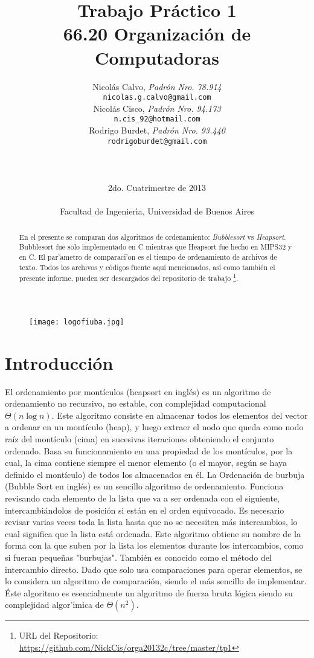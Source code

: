 \documentclass[a4paper,11pt]{article}
\title{ Trabajo Pr\'actico 1   \\
        \Large{ 66.20 Organizaci\'on de Computadoras } }
\author{Nicol\'as Calvo, \textit{Padr\'on Nro. 78.914}           	\\
            \texttt{ nicolas.g.calvo@gmail.com }      			\\
            Nicol\'as Cisco, \textit{Padr\'on Nro.  94.173}              	\\
            \texttt{ n.cis\_92@hotmail.com }                             \\
           Rodrigo Burdet, \textit{Padr\'on Nro. 93.440}                \\
            \texttt{ rodrigoburdet@gmail.com }                     		\\
             \LARGE{}         						\\
            \LARGE{}         						\\
            \LARGE{}         						\\
            \Large{2do. Cuatrimestre de 2013}         	\\                       
            \texttt{}         						\\
            \Large{Facultad de Ingenier\'\i{}a, Universidad de Buenos Aires}            \\
       }
\date{}
\begin{document}
\begin{figure}
\centering
\texttt{[image: logofiuba.jpg]}
\end{figure}


\maketitle
\thispagestyle{empty}   %
\begin{abstract}
En el presente se comparan dos algoritmos de ordenamiento: \textit{Bubblesort}\cite{Bubblesort} vs \textit{Heapsort}\cite{Heapsort}. Bubblesort fue solo implementado en C mientras que Heapsort fue hecho en MIPS32 y en C. El par'ametro de comparaci'on es el tiempo de ordenamiento de archivos de texto. 
Todos los archivos y códigos fuente aquí mencionados, así como también el presente informe, pueden ser descargados del repositorio de trabajo \footnote{URL del Repositorio: \url{https://github.com/NickCis/orga20132c/tree/master/tp1}}.
\bigskip
\end{abstract}
\newpage

\section{Introducción}
El ordenamiento por montículos (heapsort en inglés) es un algoritmo de ordenamiento no recursivo, no estable, con complejidad computacional $\Theta(n\log n)$. Este algoritmo consiste en almacenar todos los elementos del vector a ordenar en un montículo (heap), y luego extraer el nodo que queda como nodo raíz del montículo (cima) en sucesivas iteraciones obteniendo el conjunto ordenado. Basa su funcionamiento en una propiedad de los montículos, por la cual, la cima contiene siempre el menor elemento (o el mayor, según se haya definido el montículo) de todos los almacenados en él.
La Ordenación de burbuja (Bubble Sort en inglés) es un sencillo algoritmo de ordenamiento. Funciona revisando cada elemento de la lista que va a ser ordenada con el siguiente, intercambiándolos de posición si están en el orden equivocado. Es necesario revisar varias veces toda la lista hasta que no se necesiten más intercambios, lo cual significa que la lista está ordenada. Este algoritmo obtiene su nombre de la forma con la que suben por la lista los elementos durante los intercambios, como si fueran pequeñas "burbujas". También es conocido como el método del intercambio directo. Dado que solo usa comparaciones para operar elementos, se lo considera un algoritmo de comparación, siendo el más sencillo de implementar.
Éste algoritmo es esencialmente un algoritmo de fuerza bruta lógica siendo su complejidad algor'imica de $\Theta(n^2)$.
\end{document}
